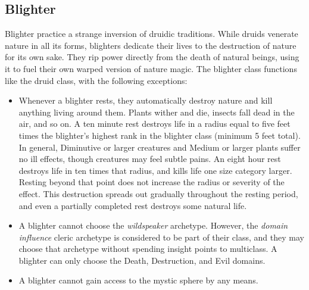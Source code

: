   \subsection{Blighter}
    Blighter practice a strange inversion of druidic traditions.
    While druids venerate nature in all its forms, blighters dedicate their lives to the destruction of nature for its own sake.
    They rip power directly from the death of natural beings, using it to fuel their own warped version of nature magic.
    The blighter class functions like the druid class, with the following exceptions:
    \begin{itemize}
      \item Whenever a blighter rests, they automatically destroy nature and kill anything living around them.
        Plants wither and die, insects fall dead in the air, and so on.
        A ten minute rest destroys life in a radius equal to five feet times the blighter's highest rank in the blighter class (minimum 5 feet total).
        In general, Diminutive or larger creatures and Medium or larger plants suffer no ill effects, though creatures may feel subtle pains.
        An eight hour rest destroys life in ten times that radius, and kills life one size category larger.
        Resting beyond that point does not increase the radius or severity of the effect.
        This destruction spreads out gradually throughout the resting period, and even a partially completed rest destroys some natural life.
      \item A blighter cannot choose the \textit{wildspeaker} archetype.
        However, the \textit{domain influence} cleric archetype is considered to be part of their class, and they may choose that archetype without spending insight points to multiclass.
        A blighter can only choose the Death, Destruction, and Evil domains.
      \item A blighter cannot gain access to the  mystic sphere by any means.
    \end{itemize}

